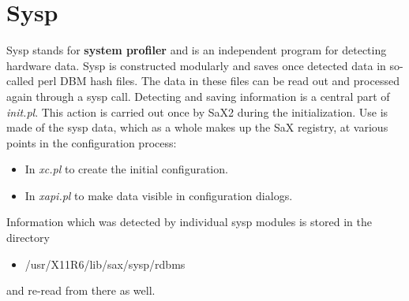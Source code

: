 \chapter{Sysp}
\label{cha:sys}
\minitoc

Sysp stands for \textbf{system profiler} and is an independent program for 
detecting hardware data.
Sysp is constructed modularly and saves once detected data in so-called perl 
DBM hash files. The data in these files can be read out and processed again
through a sysp call. Detecting and saving information is a central part of
\textit{init.pl}.
This action is carried out once by SaX2 during the initialization. Use is made
of the sysp data, which as a whole makes up the SaX registry, at various points in the configuration process:
\begin{itemize}
\item In \textit{xc.pl} to create the initial configuration.
\item In \textit{xapi.pl} to make data visible in configuration dialogs.
\end{itemize} 
Information which was detected by individual sysp modules is stored in the
directory 
\begin{itemize}
\item /usr/X11R6/lib/sax/sysp/rdbms
\end{itemize}
and re-read from there as well.

